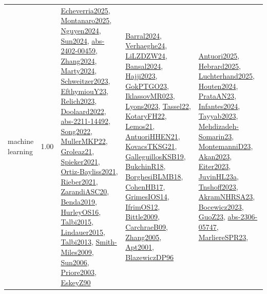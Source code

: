 {\begin{longtable}{p{3cm}r>{\raggedright\arraybackslash}p{6cm}>{\raggedright\arraybackslash}p{6cm}>{\raggedright\arraybackslash}p{8cm}}
\index{machine learning}\index{Algorithms!machine learning}machine learning &  1.00 & \hyperref[detail:Echeverria2025]{Echeverria2025}, \hyperref[detail:Montanaro2025]{Montanaro2025}, \hyperref[detail:Nguyen2024]{Nguyen2024}, \hyperref[detail:Sun2024]{Sun2024}, \hyperref[detail:abs-2402-00459]{abs-2402-00459}, \hyperref[detail:Zhang2024]{Zhang2024}, \hyperref[detail:Marty2024]{Marty2024}, \hyperref[detail:Schweitzer2023]{Schweitzer2023}, \hyperref[detail:EfthymiouY23]{EfthymiouY23}, \hyperref[detail:Relich2023]{Relich2023}, \hyperref[detail:Doolaard2022]{Doolaard2022}, \hyperref[detail:abs-2211-14492]{abs-2211-14492}, \hyperref[detail:Song2022]{Song2022}, \hyperref[detail:MullerMKP22]{MullerMKP22}, \hyperref[detail:Groleaz21]{Groleaz21}, \hyperref[detail:Spieker2021]{Spieker2021}, \hyperref[detail:Ortiz-Bayliss2021]{Ortiz-Bayliss2021}, \hyperref[detail:Rieber2021]{Rieber2021}, \hyperref[detail:ZarandiASC20]{ZarandiASC20}, \hyperref[detail:Benda2019]{Benda2019}, \hyperref[detail:HurleyOS16]{HurleyOS16}, \hyperref[detail:Talbi2015]{Talbi2015}, \hyperref[detail:Lindauer2015]{Lindauer2015}, \hyperref[detail:Talbi2013]{Talbi2013}, \hyperref[detail:Smith-Miles2009]{Smith-Miles2009}, \hyperref[detail:Sun2006]{Sun2006}, \hyperref[detail:Priore2003]{Priore2003}, \hyperref[detail:EskeyZ90]{EskeyZ90} & \hyperref[detail:Barral2024]{Barral2024}, \hyperref[detail:Verhaeghe24]{Verhaeghe24}, \hyperref[detail:LiLZDZW24]{LiLZDZW24}, \hyperref[detail:Bansal2024]{Bansal2024}, \hyperref[detail:Hajji2023]{Hajji2023}, \hyperref[detail:GokPTGO23]{GokPTGO23}, \hyperref[detail:IklassovMR023]{IklassovMR023}, \hyperref[detail:Lyons2023]{Lyons2023}, \hyperref[detail:Tassel22]{Tassel22}, \hyperref[detail:KotaryFH22]{KotaryFH22}, \hyperref[detail:Lemos21]{Lemos21}, \hyperref[detail:AntuoriHHEN21]{AntuoriHHEN21}, \hyperref[detail:KovacsTKSG21]{KovacsTKSG21}, \hyperref[detail:GalleguillosKSB19]{GalleguillosKSB19}, \hyperref[detail:BukchinR18]{BukchinR18}, \hyperref[detail:BorghesiBLMB18]{BorghesiBLMB18}, \hyperref[detail:CohenHB17]{CohenHB17}, \hyperref[detail:GrimesIOS14]{GrimesIOS14}, \hyperref[detail:IfrimOS12]{IfrimOS12}, \hyperref[detail:Bittle2009]{Bittle2009}, \hyperref[detail:CarchraeB09]{CarchraeB09}, \hyperref[detail:Zhang2005]{Zhang2005}, \hyperref[detail:Apt2001]{Apt2001}, \hyperref[detail:BlazewiczDP96]{BlazewiczDP96} & \hyperref[detail:Antuori2025]{Antuori2025}, \hyperref[detail:Hebrard2025]{Hebrard2025}, \hyperref[detail:Luchterhand2025]{Luchterhand2025}, \hyperref[detail:Houten2024]{Houten2024}, \hyperref[detail:PrataAN23]{PrataAN23}, \hyperref[detail:Infantes2024]{Infantes2024}, \hyperref[detail:Tayyab2023]{Tayyab2023}, \hyperref[detail:Mehdizadeh-Somarin23]{Mehdizadeh-Somarin23}, \hyperref[detail:MontemanniD23]{MontemanniD23}, \hyperref[detail:Akan2023]{Akan2023}, \hyperref[detail:Eiter2023]{Eiter2023}, \hyperref[detail:JuvinHL23a]{JuvinHL23a}, \hyperref[detail:Tnshoff2023]{Tnshoff2023}, \hyperref[detail:AkramNHRSA23]{AkramNHRSA23}, \hyperref[detail:Bocewicz2023]{Bocewicz2023}, \hyperref[detail:GuoZ23]{GuoZ23}, \hyperref[detail:abs-2306-05747]{abs-2306-05747}, \hyperref[detail:MarliereSPR23]{MarliereSPR23}, 
\end{longtable}}
